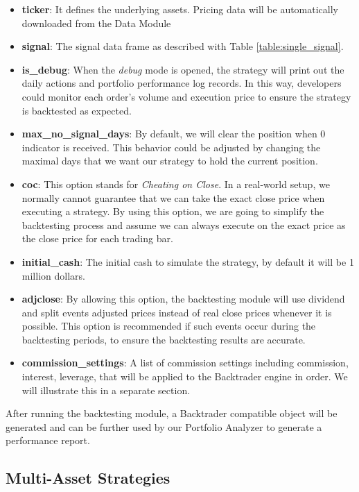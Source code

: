 \documentclass[12pt]{article}
\begin{document}
\begin{itemize}
    \item \textbf{ticker}: It defines the underlying assets. Pricing data will be automatically downloaded from the Data Module
    \item \textbf{signal}: The signal data frame as described with Table \ref{table:single_signal}.
    \item \textbf{is\_debug}: When the \textit{debug} mode is opened, the strategy will print out the daily actions and portfolio performance log records. In this way, developers could monitor each order's volume and execution price to ensure the strategy is backtested as expected.
    \item \textbf{max\_no\_signal\_days}: By default, we will clear the position when 0 indicator is received. This behavior could be adjusted by changing the maximal days that we want our strategy to hold the current position. 
    \item \textbf{coc}: This option stands for \textit{Cheating on Close}. In a real-world setup, we normally cannot guarantee that we can take the exact close price when executing a strategy. By using this option, we are going to simplify the backtesting process and assume we can always execute on the exact price as the close price for each trading bar.
    \item \textbf{initial\_cash}: The initial cash to simulate the strategy, by default it will be 1 million dollars.
    \item \textbf{adjclose}: By allowing this option, the backtesting module will use dividend and split events adjusted prices instead of real close prices whenever it is possible. This option is recommended if such events occur during the backtesting periods, to ensure the backtesting results are accurate.
    \item \textbf{commission\_settings}: A list of commission settings including commission, interest, leverage,
    that will be applied to the Backtrader engine in order. We will illustrate this in a separate section.
\end{itemize}

After running the backtesting module, a Backtrader compatible object will be generated and can be further used by our Portfolio Analyzer to generate a performance report.

\subsection{Multi-Asset Strategies}
\end{document}
